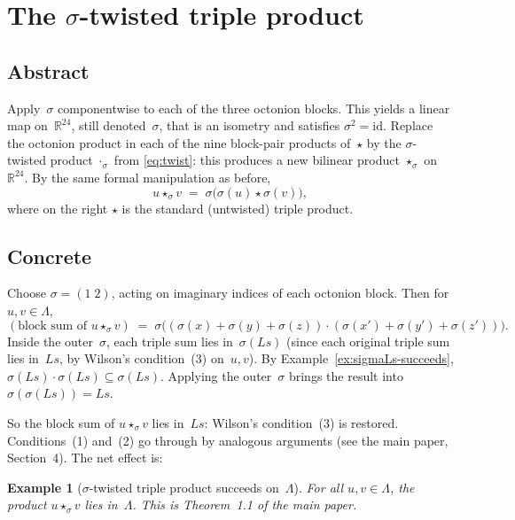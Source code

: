 \documentclass[11pt]{amsart}
\newcommand{\LL}{\Lambda}
\newcommand{\RR}{\mathbb{R}}
\newtheorem{example}{Example}[section]
\begin{document}
\section{The $\sigma$-twisted triple product}

\subsection*{Abstract}

Apply~$\sigma$ componentwise to each of the three octonion blocks.
This yields a linear map on~$\RR^{24}$, still denoted~$\sigma$, that
is an isometry and satisfies $\sigma^2 = \mathrm{id}$.  Replace the
octonion product in each of the nine block-pair products of~$\star$
by the $\sigma$-twisted product $\cdot_\sigma$ from
\eqref{eq:twist}: this produces a new bilinear product
$\star_\sigma$ on~$\RR^{24}$.  By the same formal manipulation as
before,
\[
  u \star_\sigma v \;=\; \sigma\bigl(\sigma(u) \star \sigma(v)\bigr),
\]
where on the right $\star$ is the standard (untwisted) triple
product.

\subsection*{Concrete}

Choose $\sigma = (1\; 2)$, acting on imaginary indices of each
octonion block.  Then for $u, v \in \LL$,
\[
  (\text{block sum of } u \star_\sigma v)
  \;=\;
  \sigma\bigl((\sigma(x) + \sigma(y) + \sigma(z)) \cdot
              (\sigma(x') + \sigma(y') + \sigma(z'))\bigr).
\]
Inside the outer~$\sigma$, each triple sum lies in~$\sigma(Ls)$
(since each original triple sum lies in~$Ls$, by Wilson's
condition~(3) on~$u, v$).  By
Example~\ref{ex:sigmaLs-succeeds}, $\sigma(Ls) \cdot \sigma(Ls)
\subseteq \sigma(Ls)$.  Applying the outer~$\sigma$ brings the
result into $\sigma(\sigma(Ls)) = Ls$.

So the block sum of $u \star_\sigma v$ lies in~$Ls$: Wilson's
condition~(3) is restored.  Conditions~(1) and~(2) go through by
analogous arguments (see the main paper, Section~4).  The net effect
is:

\begin{example}[$\sigma$-twisted triple product succeeds on~$\LL$]
For all $u, v \in \LL$, the product $u \star_\sigma v$ lies
in~$\LL$.  This is Theorem~1.1 of the main paper.
\end{example}
\end{document}
